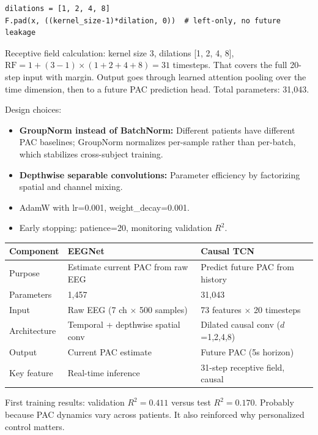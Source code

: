 \documentclass[11pt,letterpaper]{article}
\begin{document}
\begin{verbatim}
dilations = [1, 2, 4, 8]
F.pad(x, ((kernel_size-1)*dilation, 0))  # left-only, no future leakage
\end{verbatim}

Receptive field calculation: kernel size 3, dilations [1, 2, 4, 8],
$\text{RF} = 1 + (3-1) \times (1+2+4+8) = 31$ timesteps. That covers the full 20-step input
with margin. Output goes through learned attention pooling over the time dimension, then to a
future PAC prediction head. Total parameters: 31,043.

Design choices:
\begin{itemize}[noitemsep]
  \item \textbf{GroupNorm instead of BatchNorm:} Different patients have different PAC
        baselines; GroupNorm normalizes per-sample rather than per-batch, which stabilizes
        cross-subject training.
  \item \textbf{Depthwise separable convolutions:} Parameter efficiency by factorizing spatial
        and channel mixing.
  \item AdamW with lr=0.001, weight\_decay=0.001.
  \item Early stopping: patience=20, monitoring validation $R^2$.
\end{itemize}

\vspace{0.5em}
\begin{tabular}{@{}lll@{}}
\toprule
\textbf{Component} & \textbf{EEGNet} & \textbf{Causal TCN} \\
\midrule
Purpose        & Estimate current PAC from raw EEG & Predict future PAC from history \\
Parameters     & 1,457                             & 31,043 \\
Input          & Raw EEG (7 ch $\times$ 500 samples) & 73 features $\times$ 20 timesteps \\
Architecture   & Temporal + depthwise spatial conv & Dilated causal conv ($d$=1,2,4,8) \\
Output         & Current PAC estimate              & Future PAC (5s horizon) \\
Key feature    & Real-time inference               & 31-step receptive field, causal \\
\bottomrule
\end{tabular}
\vspace{0.5em}

First training results: validation $R^2 = 0.411$ versus test $R^2 = 0.170$. Probably because
PAC dynamics vary across patients. It also reinforced why personalized control matters.
\end{document}
